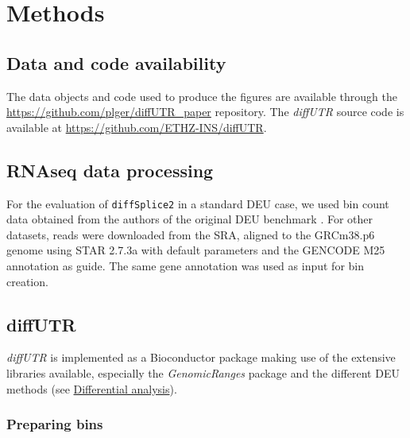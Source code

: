 \documentclass{bmcart}
\begin{document}
\section*{Methods}

\subsection{Data and code availability}

The data objects and code used to produce the figures are available through the \url{https://github.com/plger/diffUTR_paper} repository. The \textit{diffUTR} source code is available at \url{https://github.com/ETHZ-INS/diffUTR}.

\subsection{RNAseq data processing}

For the evaluation of \texttt{diffSplice2} in a standard DEU case, we used bin count data obtained from the authors of the original DEU benchmark \cite{Soneson2016IsoformUsage}. For other datasets, reads were downloaded from the SRA, aligned to the GRCm38.p6 genome using STAR 2.7.3a with default parameters and the GENCODE M25 annotation as guide. The same gene annotation was used as input for bin creation.

\subsection{diffUTR}

\textit{diffUTR} is implemented as a Bioconductor package making use of the extensive libraries available, especially the \textit{GenomicRanges} package \cite{Lawrence2013SoftwareRanges} and the different DEU methods (see \hyperref[sec:DE]{Differential analysis}).

\subsubsection{Preparing bins}
\label{sec:bins}
\end{document}
